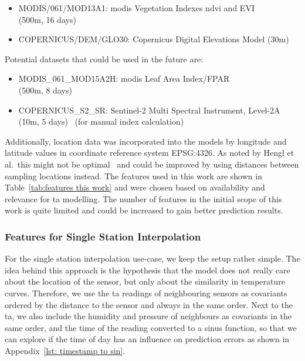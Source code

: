 \begin{itemize}
    \item MODIS/061/MOD13A1: \gls{modis} Vegetation Indexes \gls{ndvi} and EVI\\
    (500m, 16 days)~\cite{didan2021modis}
    \item COPERNICUS/DEM/GLO30: Copernicus Digital Elevations Model (30m)~\cite{copernicus30dem}
\end{itemize}

Potential datasets that could be used in the future are:

\begin{itemize}
    \item MODIS\_061\_MOD15A2H: \gls{modis} Leaf Area Index/FPAR \\
    (500m, 8 days)~\cite{myneni2021modis}
    \item COPERNICUS\_S2\_SR: Sentinel-2 Multi Spectral Instrument, Level-2A\\
    (10m, 5 days)~\cite{sentinel2msi} (for manual index calculation)
\end{itemize}

Additionally, location data was incorporated into the models by longitude and latitude values in coordinate reference system EPSG:4326. As noted by Hengl et al.\ this might not be optimal~\cite{hengl2018random} and could be improved by using distances between sampling locations instead. The features used in this work are shown in Table~\ref{tab:features this work} and were chosen based on availability and relevance for \gls{ta} modelling. The number of features in the initial scope of this work is quite limited and could be increased to gain better prediction results.

\subsubsection{Features for Single Station Interpolation}

For the single station interpolation use-case, we keep the setup rather simple. The idea behind this approach is the hypothesis that the model does not really care about the location of the sensor, but only about the similarity in temperature curves. Therefore, we use the \gls{ta} readings of neighbouring sensors as covariants ordered by the distance to the sensor and always in the same order. Next to the \gls{ta}, we also include the humidity and pressure of neighbours as covariants in the same order, and the time of the reading converted to a sinus function, so that we can explore if the time of day has an influence on prediction errors as shown in Appendix~\ref{lst: timestamp to sin}.

